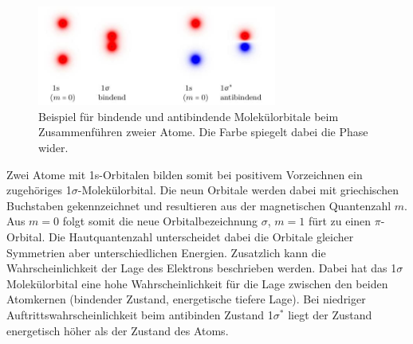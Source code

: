 \begin{figure}
    \center
    \includegraphics[width=0.7\textwidth]{bilder/mol_orbitale.jpg}
    \caption{Beispiel für bindende und antibindende Molekülorbitale beim Zusammenführen zweier Atome.
    Die Farbe spiegelt dabei die Phase wider. \cite{uni}}
\end{figure}
Zwei Atome mit 1s-Orbitalen bilden somit bei positivem Vorzeichnen ein zugehöriges 1$\sigma$-Molekülorbital. Die neun Orbitale werden dabei mit
griechischen Buchstaben gekennzeichnet und resultieren aus der magnetischen Quantenzahl $m$. Aus $m=0$ folgt somit die neue Orbitalbezeichnung 
$\sigma$, $m=1$ fürt zu einen $\pi$-Orbital.
Die Hautquantenzahl unterscheidet dabei die Orbitale gleicher Symmetrien aber unterschiedlichen Energien.
Zusatzlich kann die Wahrscheinlichkeit der Lage des Elektrons beschrieben werden. Dabei hat das 1$\sigma$ Molekülorbital eine hohe Wahrscheinlichkeit für die Lage zwischen
den beiden Atomkernen (bindender Zustand, energetische tiefere Lage). Bei niedriger Auftrittswahrscheinlichkeit beim
antibinden Zustand 1$\sigma^*$ liegt der Zustand energetisch höher als der Zustand des Atoms.










